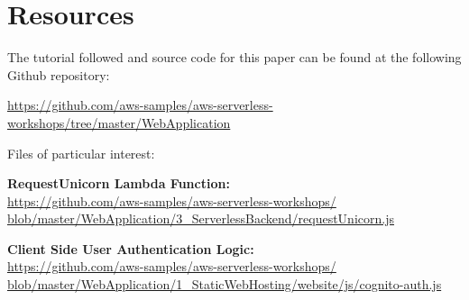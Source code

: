 \section{Resources}
The tutorial followed  and source code for this paper can be found at the following Github repository:

\noindent \href{https://github.com/aws-samples/aws-serverless-workshops/tree/master/WebApplication}{https://github.com/aws-samples/aws-serverless-workshops/tree/master/WebApplication}
\medskip

\noindent Files of particular interest:

\medskip
\noindent \textbf{RequestUnicorn Lambda Function: } \\ \href{https://github.com/aws-samples/aws-serverless-workshops/blob/master/WebApplication/3_ServerlessBackend/requestUnicorn.js}{https://github.com/aws-samples/aws-serverless-workshops/\\blob/master/WebApplication/3\_ServerlessBackend/requestUnicorn.js}

\medskip
\noindent \textbf{Client Side User Authentication Logic:} \\
\href{https://github.com/aws-samples/aws-serverless-workshops/blob/master/WebApplication/1_StaticWebHosting/website/js/cognito-auth.js}{https://github.com/aws-samples/aws-serverless-workshops/\\blob/master/WebApplication/1\_StaticWebHosting/website/js/cognito-auth.js}
